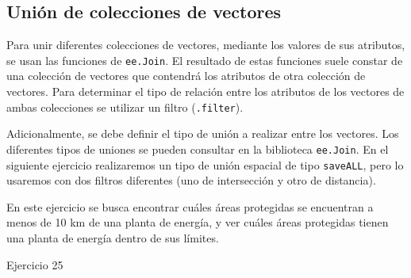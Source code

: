 \documentclass[
  12pt,
  letterpaper,
  twoside]{book}
\begin{document}
\hypertarget{uniuxf3n-de-colecciones-de-vectores}{%
\subsection*{Unión de colecciones de vectores}\label{uniuxf3n-de-colecciones-de-vectores}}

Para unir diferentes colecciones de vectores, mediante los valores de sus atributos, se usan las funciones de \texttt{ee.Join}. El resultado de estas funciones suele constar de una colección de vectores que contendrá los atributos de otra colección de vectores. Para determinar el tipo de relación entre los atributos de los vectores de ambas colecciones se utilizar un filtro (\texttt{.filter}).

Adicionalmente, se debe definir el tipo de unión a realizar entre los vectores. Los diferentes tipos de uniones se pueden consultar en la biblioteca \texttt{ee.Join}. En el siguiente ejercicio realizaremos un tipo de unión espacial de tipo \texttt{saveALL}, pero lo usaremos con dos filtros diferentes (uno de intersección y otro de distancia).

En este ejercicio se busca encontrar cuáles áreas protegidas se encuentran a menos de 10 km de una planta de energía, y ver cuáles áreas protegidas tienen una planta de energía dentro de sus límites.

Ejercicio 25
\end{document}
